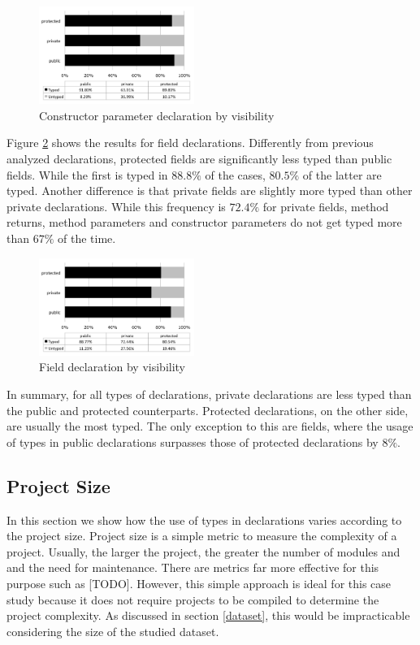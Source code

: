 \documentclass[preprint]{sigplanconf}
\begin{document}
\begin{figure}[ht]
\centering \includegraphics[width=0.45\textwidth]{images/constructor_parameter_visibility} 
\caption{Constructor parameter declaration by visibility}
\label{fig:constructor_parameter_visibility} 
\end{figure}


Figure \ref{fig:field_visibility} shows the results for field declarations. 
Differently from previous analyzed declarations, protected fields are significantly less typed than public fields. 
While the first is typed in $88.8\%$ of the cases, $80.5\%$ of the latter are typed.
Another difference is that private fields are slightly more typed than other private declarations.
While this frequency is $72.4\%$ for private fields, method returns, method parameters and constructor parameters do not get typed more than $67\%$ of the time.


\begin{figure}[ht]
\centering \includegraphics[width=0.45\textwidth]{images/field_visibility} 
\caption{Field declaration by visibility}
\label{fig:field_visibility} 
\end{figure}

In summary, for all types of declarations, private declarations are less typed than the public and protected counterparts.
Protected declarations, on the other side, are usually the most typed. The only exception to this are fields, where the usage of types in public declarations surpasses those of protected declarations by $8\%$.

\subsection{Project Size\label{sub:size-results}}
In this section we show how the use of types in declarations varies according to the project size. 
Project size is a simple metric to measure the complexity of a project.
Usually, the larger the project, the greater the number of modules and and the need for maintenance. 
There are metrics far more effective for this purpose such as [TODO].
However, this simple approach is ideal for this case study because it does not require projects to be compiled to determine the project complexity. 
As discussed in section \ref{dataset}, this would be impracticable considering the size of the studied dataset.
\end{document}
